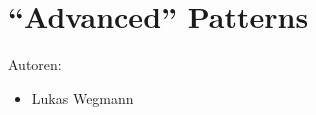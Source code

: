 \chapter{``Advanced'' Patterns}
\label{sec:advancedPatterns}

Autoren:
\begin{itemize}
	\item Lukas Wegmann
\end{itemize}


